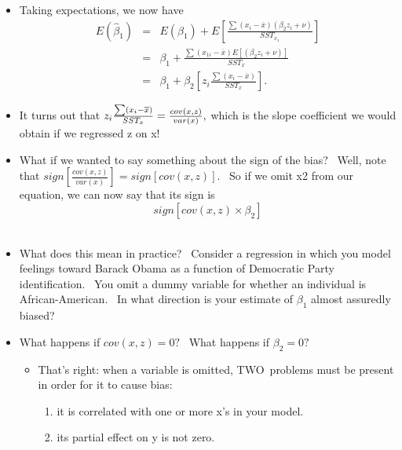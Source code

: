 \documentclass[11pt]{article}
\begin{document}
\begin{itemize}
\item Taking expectations, we now have%
\begin{eqnarray*}
E\left( \widehat{\beta }_{1}\right) &=&E\left( \beta _{1}\right) +E\left[ 
\frac{\sum \left( x_{i}-\overline{x}\right) \left( \beta _{2}z_{i}+\nu
\right) }{SST_{x_{1}}}\right] \\
&=&\beta _{1}+\frac{\sum \left( x_{1i}-\overline{x}\right) E\left[ \left(
\beta _{2}z_{i}+\nu \right) \right] }{SST_{x}} \\
&=&\beta _{1}+\beta _{2}\left[ z_{i}\frac{\sum \left( x_{i}-\overline{x}%
\right) }{SST_{x}}\right] .
\end{eqnarray*}

\item It turns out that $z_{i}\frac{\sum \left( x_{i}-\overline{x}\right) }{%
SST_{x}}=\frac{cov(x,z)}{var(x)},$ which is the slope coefficient we would
obtain if we regressed z on x! \ 

\item What if we wanted to say something about the sign of the bias? \ Well,
note that $sign\left[ \frac{cov(x,z)}{var(x)}\right] =sign\left[ cov(x,z)%
\right] .$ \ So if we omit x2 from our equation, we can now say that its
sign is 
\begin{equation*}
sign\left[ cov(x,z)\times \beta _{2}\right]
\end{equation*}%
\ 

\item What does this mean in practice? \ Consider a regression in which you
model feelings toward Barack Obama as a function of Democratic Party
identification. \ You omit a dummy variable for whether an individual is
African-American. \ In what direction is your estimate of $\beta _{1}$
almost assuredly biased?

\item What happens if $cov(x,z)=0?$ \ What happens if $\beta _{2}=0?$ \ 

\begin{itemize}
\item That's right: when a variable is omitted, TWO\ problems must be
present in order for it to cause bias:

\begin{enumerate}
\item it is correlated with one or more x's in your model.

\item its partial effect on y is not zero.
\end{enumerate}


\end{itemize}
\end{itemize}
\end{document}
